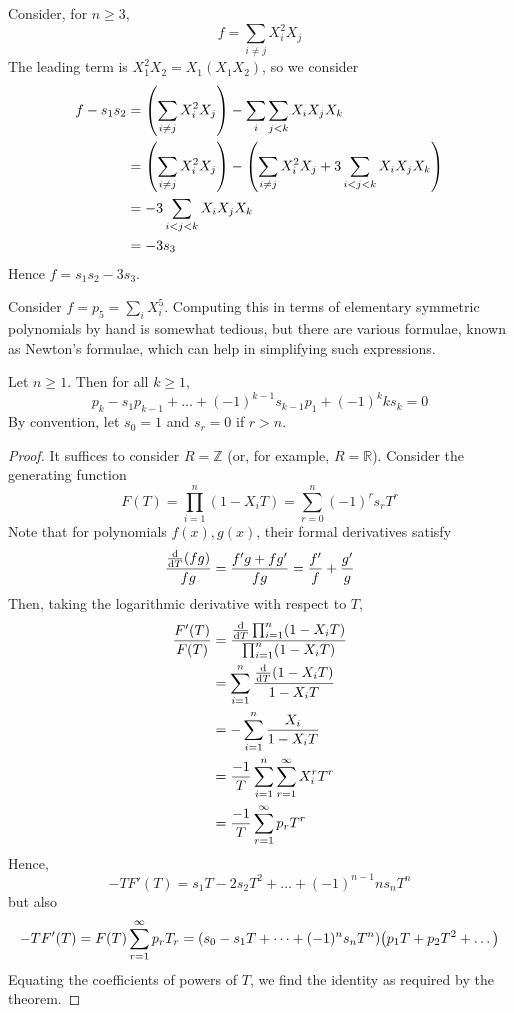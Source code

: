\begin{example}
	Consider, for \( n \geq 3 \),
	\[ f = \sum_{i\neq j} X_i^2 X_j \]
	The leading term is \( X_1^2 X_2 = X_1 (X_1 X_2) \), so we consider
	\begin{align*}
		f - s_1 s_2 &= \qty(\sum_{i \neq j} X_i^2 X_j) - \sum_i \sum_{j < k} X_i X_j X_k \\
		&= \qty(\sum_{i \neq j} X_i^2 X_j) - \qty(\sum_{i \neq j} X_i^2 X_j + 3 \sum_{i < j < k} X_i X_j X_k) \\
		&= -3 \sum_{i < j < k} X_i X_j X_k \\
		&= -3s_3
	\end{align*}
	Hence \( f = s_1 s_2 - 3 s_3 \).
\end{example}
Consider \( f = p_5 = \sum_i X_i^5 \).
Computing this in terms of elementary symmetric polynomials by hand is somewhat tedious, but there are various formulae, known as Newton's formulae, which can help in simplifying such expressions.
\begin{theorem}
	Let \( n \geq 1 \).
	Then for all \( k \geq 1 \),
	\[ p_k - s_1 p_{k-1} + \dots + (-1)^{k-1} s_{k-1} p_1 + (-1)^k k s_k = 0 \]
	By convention, let \( s_0 = 1 \) and \( s_r = 0 \) if \( r > n \).
\end{theorem}
\begin{proof}
	It suffices to consider \( R = \mathbb Z \) (or, for example, \( R = \mathbb R \)).
	Consider the generating function
	\[ F(T) = \prod_{i=1}^n (1 - X_i T) = \sum_{r=0}^n (-1)^r s_r T^r \]
	Note that for polynomials \( f(x), g(x) \), their formal derivatives satisfy
	\[ \frac{\dv{T} (fg)}{fg} = \frac{f'g + fg'}{fg} = \frac{f'}{f} + \frac{g'}{g} \]
	Then, taking the logarithmic derivative with respect to \( T \),
	\begin{align*}
		\frac{F'(T)}{F(T)} &= \frac{\dv{T} \prod_{i=1}^n (1 - X_i T)}{\prod_{i=1}^n (1 - X_i T)} \\
		&= \sum_{i=1}^n \frac{\dv{T} (1 - X_i T)}{1 - X_i T} \\
		&= -\sum_{i=1}^n \frac{X_i}{1 - X_i T} \\
		&= \frac{-1}{T} \sum_{i=1}^n \sum_{r=1}^\infty X_i^r T^r \\
		&= \frac{-1}{T} \sum_{r=1}^\infty p_r T^r
	\end{align*}
	Hence,
	\[ -TF'(T) = s_1 T - 2s_2 T^2 + \dots + (-1)^{n-1} n s_n T^n \]
	but also
	\[ -TF'(T) = F(T) \sum_{r=1}^\infty p_r T_r = \qty(s_0 - s_1 T + \dots + (-1)^n s_n T^n) \qty(p_1 T + p_2 T^2 + \dots) \]
	Equating the coefficients of powers of \( T \), we find the identity as required by the theorem.
\end{proof}
